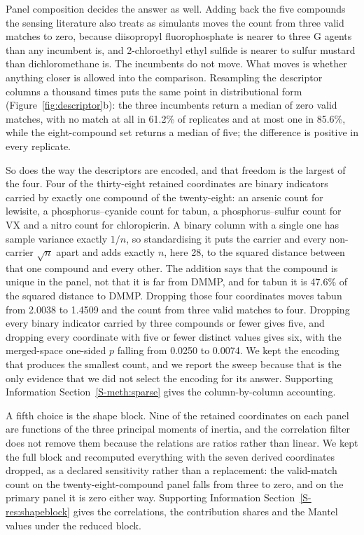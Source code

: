 \documentclass[journal=jacsat,manuscript=article,margin=1in]{achemso}
\begin{document}
Panel composition decides the answer as well. Adding back the five
compounds the sensing literature also treats as simulants moves the count
from three valid matches to zero, because diisopropyl fluorophosphate is
nearer to three G agents than any incumbent is, and 2-chloroethyl ethyl
sulfide is nearer to sulfur mustard than dichloromethane is. The incumbents
do not move. What moves is whether anything closer is allowed into the
comparison. Resampling the descriptor columns a thousand times puts the same
point in distributional form (Figure~\ref{fig:descriptor}b): the three
incumbents return a median of zero valid matches, with no match at all in
61.2\% of replicates and at most one in 85.6\%, while the eight-compound
set returns a median of five; the difference is positive in every replicate.

So does the way the descriptors are encoded, and that freedom is the
largest of the four. Four of the thirty-eight retained coordinates are
binary indicators carried by exactly one compound of the twenty-eight:
an arsenic count for lewisite, a phosphorus--cyanide count for tabun, a
phosphorus--sulfur count for VX and a nitro count for chloropicrin. A
binary column with a single one has sample variance exactly $1/n$, so
standardising it puts the carrier and every non-carrier $\sqrt{n}$ apart
and adds exactly $n$, here 28, to the squared distance between that one
compound and every other. The addition says that the compound is unique in
the panel, not that it is far from DMMP, and for tabun it is 47.6\% of the
squared distance to DMMP. Dropping those four coordinates moves tabun from
2.0038 to 1.4509 and the count from three valid matches to four. Dropping
every binary indicator carried by three compounds or fewer gives five, and
dropping every coordinate with five or fewer distinct values gives six,
with the merged-space one-sided $p$ falling from 0.0250 to 0.0074. We kept
the encoding that produces the smallest count, and we report the sweep
because that is the only evidence that we did not select the encoding for
its answer. Supporting Information Section~\ref{S-meth:sparse} gives the
column-by-column accounting.

A fifth choice is the shape block. Nine of the retained coordinates on each
panel are functions of the three principal moments of inertia, and the
correlation filter does not remove them because the relations are ratios
rather than linear. We kept the full block and recomputed everything with the
seven derived coordinates dropped, as a declared sensitivity rather than a
replacement: the valid-match count on the twenty-eight-compound panel falls
from three to zero, and on the primary panel it is zero either way.
Supporting Information Section~\ref{S-res:shapeblock} gives the correlations,
the contribution shares and the Mantel values under the reduced block.
\end{document}
